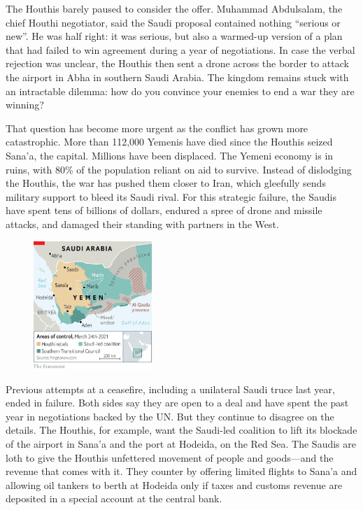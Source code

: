 \documentclass{article}
\begin{document}
The Houthis barely paused to consider the offer. Muhammad Abdulsalam, the chief Houthi negotiator, said the Saudi proposal contained nothing ``serious or new''. He was half right: it was serious, but also a warmed-up version of a plan that had failed to win agreement during a year of negotiations. In case the verbal rejection was unclear, the Houthis then sent a drone across the border to attack the airport in Abha in southern Saudi Arabia. The kingdom remains stuck with an intractable dilemma: how do you convince your enemies to end a war they are winning? 

That question has become more urgent as the conflict has grown more catastrophic. More than 112,000 Yemenis have died since the Houthis seized Sana'a, the capital. Millions have been displaced. The Yemeni economy is in ruins, with 80\% of the population reliant on aid to survive. Instead of dislodging the Houthis, the war has pushed them closer to Iran, which gleefully sends military support to bleed its Saudi rival. For this strategic failure, the Saudis have spent tens of billions of dollars, endured a spree of drone and missile attacks, and damaged their standing with partners in the West. 

\begin{figure}[h]
\centering
\includegraphics[width=0.4\textwidth]{images/20210327_MAM957.png}
\end{figure}


Previous attempts at a ceasefire, including a unilateral Saudi truce last year, ended in failure. Both sides say they are open to a deal and have spent the past year in negotiations backed by the UN. But they continue to disagree on the details. The Houthis, for example, want the Saudi-led coalition to lift its blockade of the airport in Sana'a and the port at Hodeida, on the Red Sea. The Saudis are loth to give the Houthis unfettered movement of people and goods---and the revenue that comes with it. They counter by offering limited flights to Sana'a and allowing oil tankers to berth at Hodeida only if taxes and customs revenue are deposited in a special account at the central bank. 
\end{document}

